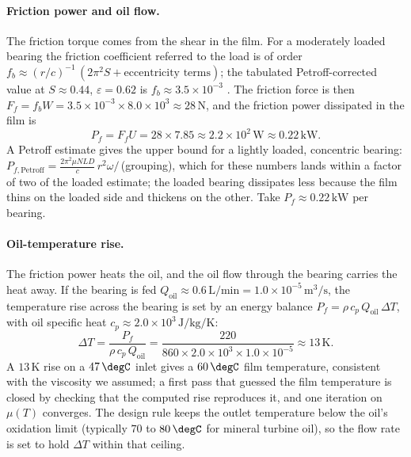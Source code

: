 \paragraph{Friction power and oil flow.} The friction torque comes
from the shear in the film. For a moderately loaded bearing the
friction coefficient referred to the load is of order
$f_b \approx (r/c)^{-1}\,(2\pi^2 S + \text{eccentricity terms})$; the
tabulated Petroff-corrected value at $S\approx0.44$, $\varepsilon=
0.62$ is $f_b \approx 3.5\times10^{-3}$
\cite{text:stachowiak-batchelor}. The friction force is then
$F_f = f_b W = 3.5\times10^{-3}\times8.0\times10^{3} \approx 28\,\si{
\newton}$, and the friction power dissipated in the film is
\[
P_f = F_f U = 28\times7.85 \approx 2.2\times10^{2}\,\si{\watt}
\approx 0.22\,\text{kW}.
\]
A Petroff estimate gives the upper bound for a lightly loaded,
concentric bearing: $P_{f,\text{Petroff}} = \frac{2\pi^2\mu N L D}{c}
\,r^2\omega/\,$(grouping), which for these numbers lands within a
factor of two of the loaded estimate; the loaded bearing dissipates
less because the film thins on the loaded side and thickens on the
other. Take $P_f \approx 0.22\,\text{kW}$ per bearing.

\paragraph{Oil-temperature rise.} The friction power heats the oil,
and the oil flow through the bearing carries the heat away. If the
bearing is fed $Q_{\text{oil}} \approx 0.6\,\text{L/min} = 1.0\times
10^{-5}\,\si{\meter\cubed\per\second}$, the temperature rise across
the bearing is set by an energy balance $P_f = \rho\,c_p\,Q_{\text{oil}}
\,\Delta T$, with oil specific heat $c_p \approx 2.0\times10^{3}\,\si{
\joule\per\kilogram\per\kelvin}$:
\[
\Delta T = \frac{P_f}{\rho\,c_p\,Q_{\text{oil}}} = \frac{220}{860
\times2.0\times10^{3}\times1.0\times10^{-5}} \approx 13\,\si{\kelvin}.
\]
A $13\,\si{\kelvin}$ rise on a $47\,\degC$ inlet gives a $60\,\degC$
film temperature, consistent with the viscosity we assumed; a first
pass that guessed the film temperature is closed by checking that the
computed rise reproduces it, and one iteration on $\mu(T)$ converges.
The design rule keeps the outlet temperature below the oil's oxidation
limit (typically $70$ to $80\,\degC$ for mineral turbine oil), so the
flow rate is set to hold $\Delta T$ within that ceiling.



